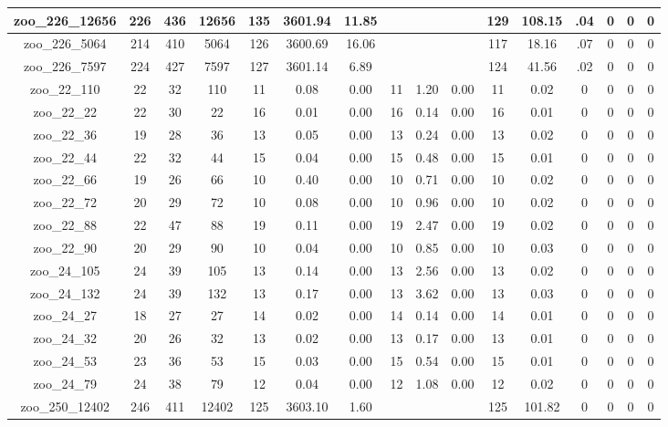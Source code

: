 \begin{landscape}
\begin{longtable}{|c|c|c|c|c|c|c|c|c|c|c|c|c|c|c|c|}
zoo\_226\_12656 & 226 & 436 & 12656 & 135 & 3601.94 & 11.85 &  &  &  & 129 & 108.15 & .04 & 0 & 0 & 0 \\ \hline 
zoo\_226\_5064 & 214 & 410 & 5064 & 126 & 3600.69 & 16.06 &  &  &  & 117 & 18.16 & .07 & 0 & 0 & 0 \\ \hline 
zoo\_226\_7597 & 224 & 427 & 7597 & 127 & 3601.14 & 6.89 &  &  &  & 124 & 41.56 & .02 & 0 & 0 & 0 \\ \hline 
zoo\_22\_110 & 22 & 32 & 110 & 11 & 0.08 & 0.00 & 11 & 1.20 & 0.00 & 11 & 0.02 & 0 & 0 & 0 & 0 \\ \hline 
zoo\_22\_22 & 22 & 30 & 22 & 16 & 0.01 & 0.00 & 16 & 0.14 & 0.00 & 16 & 0.01 & 0 & 0 & 0 & 0 \\ \hline 
zoo\_22\_36 & 19 & 28 & 36 & 13 & 0.05 & 0.00 & 13 & 0.24 & 0.00 & 13 & 0.02 & 0 & 0 & 0 & 0 \\ \hline 
zoo\_22\_44 & 22 & 32 & 44 & 15 & 0.04 & 0.00 & 15 & 0.48 & 0.00 & 15 & 0.01 & 0 & 0 & 0 & 0 \\ \hline 
zoo\_22\_66 & 19 & 26 & 66 & 10 & 0.40 & 0.00 & 10 & 0.71 & 0.00 & 10 & 0.02 & 0 & 0 & 0 & 0 \\ \hline 
zoo\_22\_72 & 20 & 29 & 72 & 10 & 0.08 & 0.00 & 10 & 0.96 & 0.00 & 10 & 0.02 & 0 & 0 & 0 & 0 \\ \hline 
zoo\_22\_88 & 22 & 47 & 88 & 19 & 0.11 & 0.00 & 19 & 2.47 & 0.00 & 19 & 0.02 & 0 & 0 & 0 & 0 \\ \hline 
zoo\_22\_90 & 20 & 29 & 90 & 10 & 0.04 & 0.00 & 10 & 0.85 & 0.00 & 10 & 0.03 & 0 & 0 & 0 & 0 \\ \hline 
zoo\_24\_105 & 24 & 39 & 105 & 13 & 0.14 & 0.00 & 13 & 2.56 & 0.00 & 13 & 0.02 & 0 & 0 & 0 & 0 \\ \hline 
zoo\_24\_132 & 24 & 39 & 132 & 13 & 0.17 & 0.00 & 13 & 3.62 & 0.00 & 13 & 0.03 & 0 & 0 & 0 & 0 \\ \hline 
zoo\_24\_27 & 18 & 27 & 27 & 14 & 0.02 & 0.00 & 14 & 0.14 & 0.00 & 14 & 0.01 & 0 & 0 & 0 & 0 \\ \hline 
zoo\_24\_32 & 20 & 26 & 32 & 13 & 0.02 & 0.00 & 13 & 0.17 & 0.00 & 13 & 0.01 & 0 & 0 & 0 & 0 \\ \hline 
zoo\_24\_53 & 23 & 36 & 53 & 15 & 0.03 & 0.00 & 15 & 0.54 & 0.00 & 15 & 0.01 & 0 & 0 & 0 & 0 \\ \hline 
zoo\_24\_79 & 24 & 38 & 79 & 12 & 0.04 & 0.00 & 12 & 1.08 & 0.00 & 12 & 0.02 & 0 & 0 & 0 & 0 \\ \hline 
zoo\_250\_12402 & 246 & 411 & 12402 & 125 & 3603.10 & 1.60 &  &  &  & 125 & 101.82 & 0 & 0 & 0 & 0 \\ \hline 

\end{longtable}
\end{landscape}
